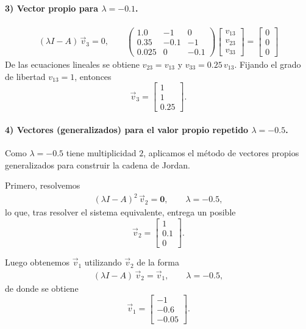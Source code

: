 \documentclass[
  11pt,
  letterpaper,
   addpoints,
  answers
  ]{exam}
\begin{document}
\begin{questions}
\begin{solution}
\paragraph{3) Vector propio para $\lambda=-0.1$.}
\begin{align}
(
\lambda I-A)\,\vec v_3 = 0, \qquad
\left(
\begin{array}{ccc}
1.0 & -1 & 0\\
0.35 & -0.1 & -1\\
0.025 & 0 & -0.1
\end{array}\right)
\begin{bmatrix}v_{13}\\ v_{23}\\ v_{33}\end{bmatrix}
=
\begin{bmatrix}
0\\0\\0
\end{bmatrix}
\end{align}
De las ecuaciones lineales se obtiene $v_{23}=v_{13}$ y $v_{33}=0.25\,v_{13}$. 
Fijando el grado de libertad $v_{13}=1$, entonces
\begin{equation}
\vec v_3=\begin{bmatrix}1\\1\\0.25\end{bmatrix}.
\end{equation}

\paragraph{4) Vectores (generalizados) para el valor propio repetido $\lambda=-0.5$.}
Como $\lambda=-0.5$ tiene multiplicidad $2$, aplicamos el método de vectores propios generalizados para construir la cadena de Jordan.

Primero, resolvemos
\begin{align}
(\lambda I-A)^2\,\vec v_2=\mathbf 0,\qquad \lambda=-0.5,
\end{align}
lo que, tras resolver el sistema equivalente, entrega un posible
\begin{equation}
\vec v_2=\begin{bmatrix}1\\0.1\\0\end{bmatrix}.
\end{equation}

Luego obtenemos $\vec v_1$ utilizando $\vec v_2$ de la forma
\begin{align}
(\lambda I-A)\,\vec v_2=\vec v_1, \qquad \lambda=-0.5,
\end{align}
de donde se obtiene
\begin{equation}
\vec v_1=\begin{bmatrix}-1\\-0.6\\-0.05\end{bmatrix}.
\end{equation}


\end{solution}
\end{questions}
\end{document}
